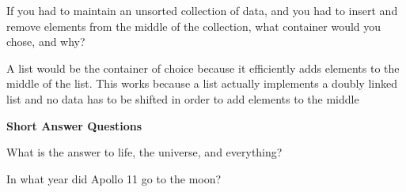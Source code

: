 \documentclass[10pt,answers,addpoints]{exam}
\begin{document}
\begin{questions}
\par\vspace{0.100000in}\begin{minipage}{\linewidth}
\question[10]

If you had to maintain an unsorted collection of data, and you had to insert
and remove elements from the middle of the collection, what container would
you chose, and why?

\begin{solution}[3in]

A list would be the container of choice because it efficiently adds elements
to the middle of the list. This works because a list actually implements a
doubly linked list and no data has to be shifted in order to add elements to
the middle

\end{solution}
\end{minipage}





\newpage
\begin{center}
{\Large \textbf{Short Answer Questions}}
\end{center}

\par\vspace{0.100000in}\begin{minipage}{\linewidth}
\vspace{.35cm}\question[2]
What is the answer to life, the universe, and everything?
\vspace{.25cm}\setlength\answerlinelength{1in}
\answerline[42]
\end{minipage}


\par\vspace{0.100000in}\begin{minipage}{\linewidth}
\vspace{.35cm}\question[2]
In what year did Apollo 11 go to the moon?
\vspace{.25cm}\setlength\answerlinelength{1in}
\answerline[1969]
\end{minipage}



\end{questions}
\end{document}
